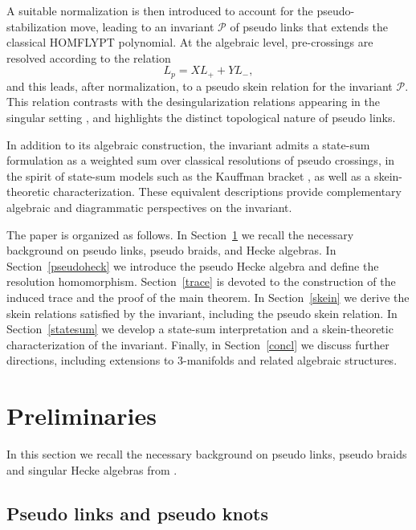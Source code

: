 \documentclass[11pt]{article}
\numberwithin{equation}{section}
\theoremstyle{definition}
\begin{document}
A suitable normalization is then introduced to account for the pseudo-stabilization move, leading to an invariant \(\mathcal P\) of pseudo links that extends the classical HOMFLYPT polynomial. At the algebraic level, pre-crossings are resolved according to the relation
\[
L_p = X L_+ + Y L_-,
\]
and this leads, after normalization, to a pseudo skein relation for the invariant \(\mathcal P\). This relation contrasts with the desingularization relations appearing in the singular setting \cite{ParisRabenda2008}, and highlights the distinct topological nature of pseudo links.

In addition to its algebraic construction, the invariant admits a state-sum formulation as a weighted sum over classical resolutions of pseudo crossings, in the spirit of state-sum models such as the Kauffman bracket \cite{Kauffman1988}, as well as a skein-theoretic characterization. These equivalent descriptions provide complementary algebraic and diagrammatic perspectives on the invariant.

\medskip 

The paper is organized as follows. In Section~\ref{preliminaries} we recall the necessary background on pseudo links, pseudo braids, and Hecke algebras. In Section~\ref{pseudoheck} we introduce the pseudo Hecke algebra and define the resolution homomorphism. Section~\ref{trace} is devoted to the construction of the induced trace and the proof of the main theorem. In Section~\ref{skein} we derive the skein relations satisfied by the invariant, including the pseudo skein relation. In Section~\ref{statesum} we develop a state-sum interpretation and a skein-theoretic characterization of the invariant. Finally, in Section~\ref{concl} we discuss further directions, including extensions to 3-manifolds and related algebraic structures.


\section{Preliminaries}\label{preliminaries}

In this section we recall the necessary background on pseudo links, pseudo braids and singular Hecke algebras from \cite{Henrich2013,BardakovJablanWang2016,ParisRabenda2008}.


\subsection{Pseudo links and pseudo knots}
\end{document}
